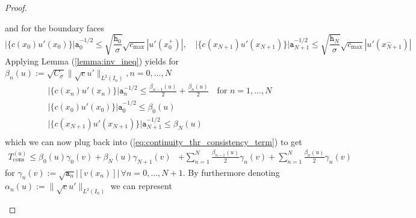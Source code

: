 \begin{proof}
\begin{proofstep}[Continuity]
		and for the boundary faces
		\begin{equation}
			\big|\{c(x_0)u'(x_0)\}\big|\texttt{a}_0^{-1/2}
			\leq \sqrt{\frac{\texttt{h}_0}{\sigma}} \sqrt{c_{\max}}
			|u'(x_0^+)|,
			\quad \big|\{c(x_{N+1})u'(x_{N+1})\}\big|\texttt{a}_{N+1}^{-1/2}
			\leq \sqrt{\frac{\texttt{h}_{N}}{\sigma}} \sqrt{c_{\max}}
			|u'(x_{N+1}^-)| \nonumber
		\end{equation}
		Applying Lemma (\ref{lemma:inv_ineq}) yields for
		$\displaystyle \beta_n(u) := \sqrt{C_{\sigma}} \|\sqrt{c}u'\|_{L^2(I_{n})}, n=0,\ldots,N$
		\begin{align*}
			 & \big|\{c(x_n)u'(x_n)\}\big|\texttt{a}_n^{-1/2} \leq \frac{\beta_{n-1}(u)}{2}
			+ \frac{\beta_n(u)}{2}  \quad \text{for } n=1,\ldots,N                          \\
			 & \big|\{c(x_0)u'(x_0)\}\big|\texttt{a}_0^{-1/2} \leq \beta_0(u)               \\
			 & \big|\{c(x_{N+1})u'(x_{N+1})\}\big|\texttt{a}_{N+1}^{-1/2} \leq \beta_{N}(u) \\
		\end{align*}
		which we can now plug back into (\ref{eq:continuity_thr_consistency_term}) to get
		\begin{align}
			T_{\text{cons}}^{(u)}
			\leq \beta_0(u)\gamma_0(v) + \beta_{N}(u)\gamma_{N+1}(v)
			 & + \sum_{n=1}^{N} \frac{\beta_{n-1}(u)}{2} \gamma_{n} (v)+ \sum_{n=1}^{N} \frac{\beta_{n}(u)}{2} \gamma_n(v)
		\end{align}
		for $\displaystyle \gamma_n(v) := \sqrt{\texttt{a}_n}\big|[v(x_n)]\big| \, \forall n=0,\ldots,N+1$.
		By furthermore denoting $ \alpha_n(u):= \|\sqrt{c}u'\|_{L^2(I_n)}$
		we can represent


\end{proofstep}
\end{proof}
